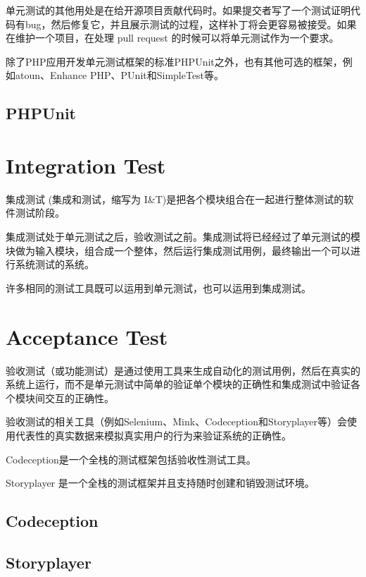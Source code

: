 单元测试的其他用处是在给开源项目贡献代码时。如果提交者写了一个测试证明代码有bug，然后修复它，并且展示测试的过程，这样补丁将会更容易被接受。如果在维护一个项目，在处理 pull request 的时候可以将单元测试作为一个要求。

除了PHP应用开发单元测试框架的标准PHPUnit之外，也有其他可选的框架，例如atoun、Enhance PHP、PUnit和SimpleTest等。

\subsection{PHPUnit}


\section{Integration Test}

集成测试 (集成和测试，缩写为 I\&T)是把各个模块组合在一起进行整体测试的软件测试阶段。

集成测试处于单元测试之后，验收测试之前。集成测试将已经经过了单元测试的模块做为输入模块，组合成一个整体，然后运行集成测试用例，最终输出一个可以进行系统测试的系统。

许多相同的测试工具既可以运用到单元测试，也可以运用到集成测试。

\section{Acceptance Test}

验收测试（或功能测试）是通过使用工具来生成自动化的测试用例，然后在真实的系统上运行，而不是单元测试中简单的验证单个模块的正确性和集成测试中验证各个模块间交互的正确性。

验收测试的相关工具（例如Selenium、Mink、Codeception和Storyplayer等）会使用代表性的真实数据来模拟真实用户的行为来验证系统的正确性。

\begin{compactitem}
\item Codeception是一个全栈的测试框架包括验收性测试工具。
\item Storyplayer 是一个全栈的测试框架并且支持随时创建和销毁测试环境。
\end{compactitem}


\subsection{Codeception}



\subsection{Storyplayer}




